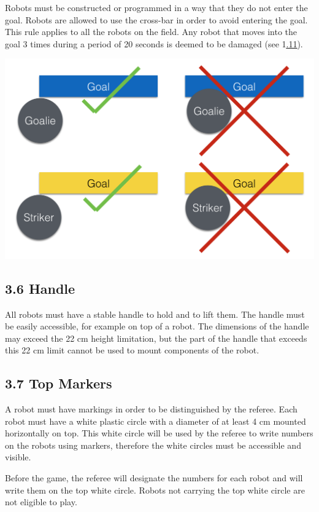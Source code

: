 \documentclass{article}
\begin{document}
Robots must be constructed or programmed in a way that they do not enter the goal. Robots are allowed to use the cross-bar in order to avoid entering the goal. This rule applies to all the robots on the field. \textcolor{color-5}{Any robot that moves into the goal 3 times during a period of 20 seconds is deemed to be damaged (see 1}\underline{{\hyperref[ref-012]{.11}}}\textcolor{color-5}{).}

\includegraphics[width=1\textwidth]{media/image3.png}

\subsection{3.6 Handle \label{ref-024}}

All robots must have a stable handle to hold and to lift them. The handle must be easily accessible, for example on top of a robot. The dimensions of the handle may exceed the 22 cm height limitation, but the part of the handle that exceeds this 22 cm limit cannot be used to mount components of the robot.

\subsection{3.7 Top Markers\label{ref-025}}

\textcolor{color-5}{A robot must have markings in order to be distinguished by the referee. Each robot must have a white plastic circle with a diameter of at least 4 cm mounted horizontally on top. This white circle will be used by the referee to write numbers on the robots using markers, therefore the white circles must be accessible and visible.} 

\textcolor{color-5}{Before the game, the referee will designate the numbers for each robot and will write them on the top white circle. Robots not carrying the top white circle are not eligible to play.} 
\end{document}
